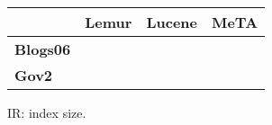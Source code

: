 \begin{figure}[t]
\centering
{\small
\begin{tabular}{|l|r|r|r|}
    \hline & \textbf{Lemur} & \textbf{Lucene} & \textbf{MeTA} \\
    \hline
    \textbf{Blogs06} & & & \\
    \textbf{Gov2} & & & \\
    \hline
\end{tabular}
}
\caption{IR: index size.}
\label{fig:ir-index-size}
\end{figure}
